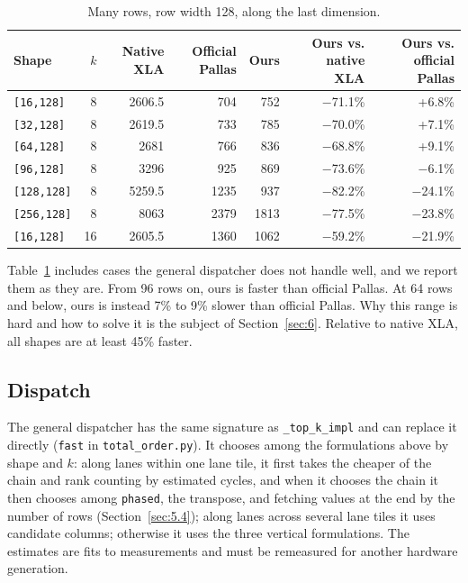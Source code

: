 \documentclass[sigconf,nonacm,balance=false]{acmart}
\newcommand{\code}[1]{\texttt{#1}}
\begin{document}
\begin{table}
\centering
\caption{Many rows, row width 128, along the last dimension.}
\label{tab:11}
\begin{tabular}{lrrrrrr}
\toprule
Shape & $k$ & Native XLA & Official Pallas & Ours & Ours vs. native XLA & Ours vs. official Pallas \\
\midrule
\code{[16,\allowbreak{}128]} & 8 & 2606.5 & 704 & 752 & $-$71.1\% & +6.8\% \\
\code{[32,\allowbreak{}128]} & 8 & 2619.5 & 733 & 785 & $-$70.0\% & +7.1\% \\
\code{[64,\allowbreak{}128]} & 8 & 2681 & 766 & 836 & $-$68.8\% & +9.1\% \\
\code{[96,\allowbreak{}128]} & 8 & 3296 & 925 & 869 & $-$73.6\% & $-$6.1\% \\
\code{[128,\allowbreak{}128]} & 8 & 5259.5 & 1235 & 937 & $-$82.2\% & $-$24.1\% \\
\code{[256,\allowbreak{}128]} & 8 & 8063 & 2379 & 1813 & $-$77.5\% & $-$23.8\% \\
\code{[16,\allowbreak{}128]} & 16 & 2605.5 & 1360 & 1062 & $-$59.2\% & $-$21.9\% \\
\bottomrule
\end{tabular}
\end{table}

Table~\ref{tab:11} includes cases the general dispatcher does not handle well, and we report them as they are. From 96 rows on, ours is faster than official Pallas. At 64 rows and below, ours is instead 7\% to 9\% slower than official Pallas. Why this range is hard and how to solve it is the subject of Section~\ref{sec:6}. Relative to native XLA, all shapes are at least 45\% faster.

\subsection{Dispatch}
\label{sec:5.5}

The general dispatcher has the same signature as \code{\_\allowbreak{}top\_\allowbreak{}k\_\allowbreak{}impl} and can replace it directly (\code{fast} in \code{total\_\allowbreak{}order.\allowbreak{}py}). It chooses among the formulations above by shape and $k$: along lanes within one lane tile, it first takes the cheaper of the chain and rank counting by estimated cycles, and when it chooses the chain it then chooses among \code{phased}, the transpose, and fetching values at the end by the number of rows (Section~\ref{sec:5.4}); along lanes across several lane tiles it uses candidate columns; otherwise it uses the three vertical formulations. The estimates are fits to measurements and must be remeasured for another hardware generation.
\end{document}
